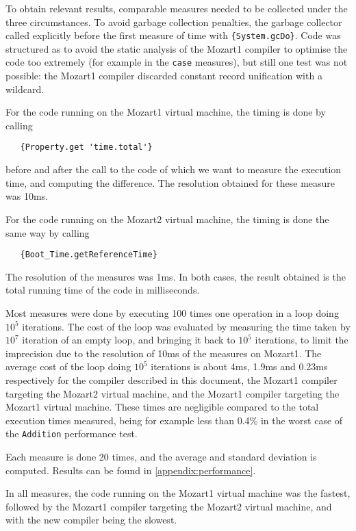\documentclass[a4paper]{memoir}
\begin{document}
To obtain relevant results, comparable measures needed to be collected under the
three circumstances.
To avoid garbage collection penalties, the garbage collector called explicitly before the
first measure of time with \lstinline!{System.gcDo}!.
Code was structured as to avoid the static analysis of the Mozart1 compiler to
optimise the code too extremely (for example in the \lstinline!case! measures), but still
one test was not possible: the Mozart1 compiler discarded constant record unification with a wildcard.

For the code running on the Mozart1 virtual machine, the timing is done by
calling 
\begin{lstlisting}
   {Property.get 'time.total'}
\end{lstlisting}
before and after the call to the code of which we want to measure the execution
time, and computing the difference. The resolution obtained for these measure was 10ms.

For the code running on the Mozart2 virtual machine, the timing is done
the same way by calling 
\begin{lstlisting}
   {Boot_Time.getReferenceTime}
\end{lstlisting}
The resolution of the measures was 1ms.
In both cases, the result obtained is the total running time of the code in milliseconds.

Most measures were done by executing 100 times one operation in a loop doing $10^5$ iterations.
The cost of the loop was evaluated by measuring the time taken by $10^7$ iteration of an empty loop, 
and bringing it back to $10^5$ iterations, to limit the imprecision due to the
resolution of 10ms of the measures on Mozart1.
The average cost of the loop doing $10^5$ iterations is about 4ms, 1.9ms and 0.23ms respectively for
the compiler described in this document, the Mozart1 compiler targeting the
Mozart2 virtual machine, and the Mozart1 compiler targeting the Mozart1
virtual machine. These times are negligible compared to the total execution
times measured, being for example less than 0.4\% in the worst case of the \lstinline!Addition!
performance test.


Each measure is done 20 times, and the average and standard deviation is
computed. Results can be found in \ref{appendix:performance}.

In all measures, the code running on the Mozart1 virtual machine was the
fastest, followed by the Mozart1 compiler targeting the Mozart2 virtual
machine, and with the new compiler being the slowest.
\end{document}
